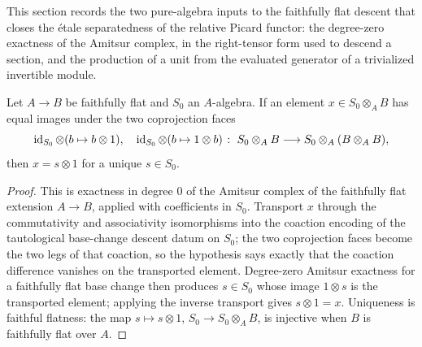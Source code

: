 This section records the two pure-algebra inputs to the faithfully flat descent that closes
the \'etale separatedness of the relative Picard functor: the degree-zero exactness of the
Amitsur complex, in the right-tensor form used to descend a section, and the production of a
unit from the evaluated generator of a trivialized invertible module.

\begin{theorem}
  \label{pa-thm:descent_existsUnique_tmul_one}
  \leanok

  Let \(A \to B\) be faithfully flat and \(S_0\) an \(A\)-algebra. If an element \(x \in S_0
  \otimes_A B\) has equal images under the two coprojection faces
  \[
    \operatorname{id}_{S_0} \otimes (b \mapsto b \otimes 1), \quad \operatorname{id}_{S_0} \otimes (b \mapsto 1 \otimes b)
    \;\colon\; S_0 \otimes_A B \longrightarrow S_0 \otimes_A (B \otimes_A B),
  \]
  then \(x = s \otimes 1\) for a unique \(s \in S_0\).
\end{theorem}
\begin{proof}
  \leanok
  This is exactness in degree \(0\) of the Amitsur complex of the faithfully flat extension
  \(A \to B\), applied with coefficients in \(S_0\).  Transport \(x\) through the
  commutativity and associativity isomorphisms into the coaction encoding of the tautological
  base-change descent datum on \(S_0\); the two coprojection faces become the two legs of that
  coaction, so the hypothesis says exactly that the coaction difference vanishes on the
  transported element.  Degree-zero Amitsur exactness for a faithfully flat base change then
  produces \(s \in S_0\) whose image \(1 \otimes s\) is the transported element; applying the
  inverse transport gives \(s \otimes 1 = x\).  Uniqueness is faithful flatness: the map \(s
  \mapsto s \otimes 1\), \(S_0 \to S_0 \otimes_A B\), is injective when \(B\) is faithfully
  flat over \(A\).
\end{proof}

